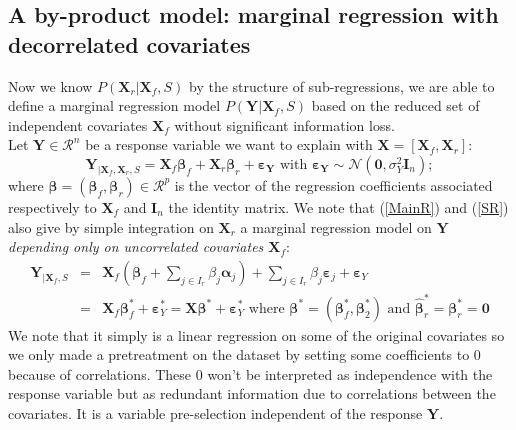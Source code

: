 \documentclass[11pt,a4paper]{article}
\begin{document}


	
\subsection{A by-product model: marginal regression with decorrelated covariates}
Now we know $P(\boldsymbol{X}_r|\boldsymbol{X}_f,S)$ by the structure of sub-regressions, we are able to define a marginal regression model $P(\boldsymbol{Y}|\boldsymbol{X}_f,S)$ based on the reduced set of independent covariates $\boldsymbol{X}_f$ without significant information loss. 
 	\\
Let $\boldsymbol{Y} \in \mathcal{R}^n$ be a response variable we want to explain with $\boldsymbol{X}=[\boldsymbol{X}_f,\boldsymbol{X}_r]$:
	\begin{equation}
			\boldsymbol{Y}_{|\boldsymbol{X}_f,\boldsymbol{X}_r,S}=\boldsymbol{X}_f\boldsymbol{\beta}_f+\boldsymbol{X}_r\boldsymbol{\beta}_r+\boldsymbol{\varepsilon_Y} \textrm{ with } \boldsymbol{\varepsilon_Y} \sim \mathcal{N}(\boldsymbol{0},\sigma^2_Y\boldsymbol{I}_n);	\label{MainR}
		\end{equation}
		where $\boldsymbol{\beta}=(\boldsymbol{\beta}_f,\boldsymbol{\beta}_r) \in  \mathcal{R}^p$ is the vector of the regression coefficients associated respectively to $\boldsymbol{X}_f$ and $\boldsymbol{I}_n$ the identity matrix. 
We note that (\ref{MainR}) and (\ref{SR}) also give by simple integration on $\boldsymbol{X}_r$ a marginal regression model on $\boldsymbol{Y}$ {\it depending only on uncorrelated covariates $\boldsymbol{X}_f$}:
\begin{eqnarray}
	\boldsymbol{Y}_{|\boldsymbol{X}_f,S}&=&\boldsymbol{X}_f (\boldsymbol{\beta}_f+ \sum_{j \in I_r}\beta_{j}\boldsymbol{\alpha}_j)+  \sum_{j \in I_r}\beta_{j}\boldsymbol{\varepsilon}_j+\boldsymbol{\varepsilon}_Y \label{Trueexpl} \\
	&=&\boldsymbol{X}_f\boldsymbol{\beta}_f^*+\boldsymbol{\varepsilon}_Y^*=\boldsymbol{X}\boldsymbol{\beta}^*+\boldsymbol{\varepsilon}_Y^* \textrm{ where }\boldsymbol{\beta}^*=(\boldsymbol{\beta}_f^*,\boldsymbol{\beta}_2^*) \textrm{ and } \hat{\boldsymbol{\beta}}_r^*=\boldsymbol{\beta}_r^*=\boldsymbol{0}\label{modexpl}
\end{eqnarray}
We note that it simply is a linear regression on some of the original covariates so we only made a pretreatment on the dataset by setting some coefficients to $0$ because of correlations. These $0$ won't be interpreted as independence with the response variable but as redundant information due to correlations between the covariates. It is a variable pre-selection independent of the response $\boldsymbol{Y}$. 
\end{document}
